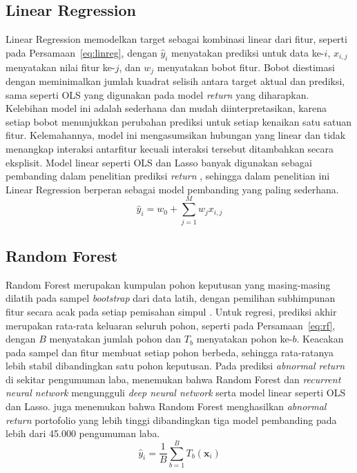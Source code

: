 \subsection{Linear Regression}

Linear Regression memodelkan target sebagai kombinasi linear dari fitur, seperti pada Persamaan~\ref{eq:linreg}, dengan $\hat{y}_i$ menyatakan prediksi untuk data ke-$i$, $x_{i,j}$ menyatakan nilai fitur ke-$j$, dan $w_j$ menyatakan bobot fitur. Bobot diestimasi dengan meminimalkan jumlah kuadrat selisih antara target aktual dan prediksi, sama seperti OLS yang digunakan pada model \emph{return} yang diharapkan. Kelebihan model ini adalah sederhana dan mudah diinterpretasikan, karena setiap bobot menunjukkan perubahan prediksi untuk setiap kenaikan satu satuan fitur. Kelemahannya, model ini mengasumsikan hubungan yang linear dan tidak menangkap interaksi antarfitur kecuali interaksi tersebut ditambahkan secara eksplisit. Model linear seperti OLS dan Lasso banyak digunakan sebagai pembanding dalam penelitian prediksi \emph{return} \autocite{gu2020,amelzadeh2020}, sehingga dalam penelitian ini Linear Regression berperan sebagai model pembanding yang paling sederhana.
\begin{equation}
\hat{y}_i = w_0 + \sum_{j=1}^{M} w_j x_{i,j}
\label{eq:linreg}
\end{equation}

\subsection{Random Forest}

Random Forest merupakan kumpulan pohon keputusan yang masing-masing dilatih pada sampel \emph{bootstrap} dari data latih, dengan pemilihan subhimpunan fitur secara acak pada setiap pemisahan simpul \autocite{breiman2001}. Untuk regresi, prediksi akhir merupakan rata-rata keluaran seluruh pohon, seperti pada Persamaan~\ref{eq:rf}, dengan $B$ menyatakan jumlah pohon dan $T_b$ menyatakan pohon ke-$b$. Keacakan pada sampel dan fitur membuat setiap pohon berbeda, sehingga rata-ratanya lebih stabil dibandingkan satu pohon keputusan. Pada prediksi \emph{abnormal return} di sekitar pengumuman laba, \textcite{amelzadeh2020} menemukan bahwa Random Forest dan \emph{recurrent neural network} mengungguli \emph{deep neural network} serta model linear seperti OLS dan Lasso. \textcite{schnaubelt2020} juga menemukan bahwa Random Forest menghasilkan \emph{abnormal return} portofolio yang lebih tinggi dibandingkan tiga model pembanding pada lebih dari 45.000 pengumuman laba.
\begin{equation}
\hat{y}_i = \frac{1}{B} \sum_{b=1}^{B} T_b(\mathbf{x}_i)
\label{eq:rf}
\end{equation}


